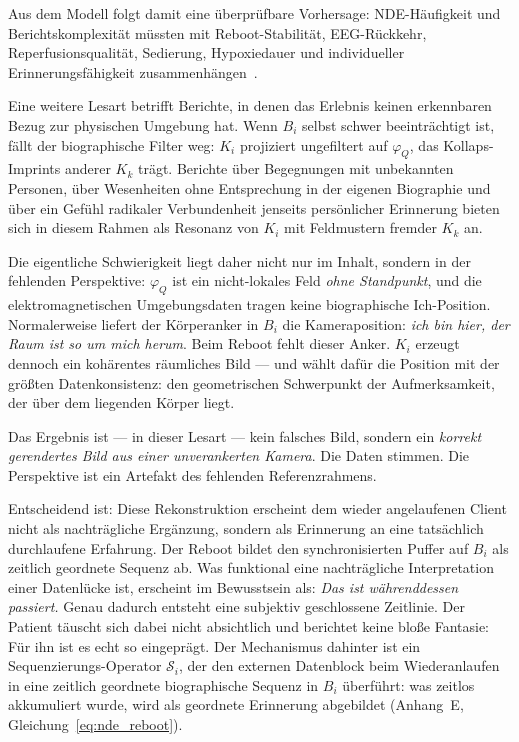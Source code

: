 \documentclass[11pt,a4paper]{article}
\begin{document}
Aus dem Modell folgt damit eine überprüfbare Vorhersage: NDE-Häufigkeit und
Berichtskomplexität müssten mit Reboot-Stabilität, EEG-Rückkehr,
Reperfusionsqualität, Sedierung, Hypoxiedauer und individueller
Erinnerungsfähigkeit zusammenhängen~\citep{parnia2023}.

Eine weitere Lesart betrifft Berichte, in denen
das Erlebnis keinen erkennbaren Bezug zur physischen Umgebung hat.
Wenn $B_i$ selbst schwer beeinträchtigt ist, fällt der biographische Filter
weg: $K_i$ projiziert ungefiltert auf $\varphi_Q$, das Kollaps-Imprints
anderer $K_k$ trägt. Berichte über Begegnungen mit unbekannten Personen,
über Wesenheiten ohne Entsprechung in der eigenen Biographie und über ein
Gefühl radikaler Verbundenheit jenseits persönlicher Erinnerung bieten sich
in diesem Rahmen als Resonanz von $K_i$ mit Feldmustern fremder $K_k$ an.

Die eigentliche Schwierigkeit liegt daher nicht nur im Inhalt, sondern in der
fehlenden Perspektive: $\varphi_Q$ ist ein nicht-lokales Feld \emph{ohne
Standpunkt}, und die elektromagnetischen Umgebungsdaten tragen keine
biographische Ich-Position. Normalerweise liefert der Körperanker in $B_i$
die Kameraposition: \emph{ich bin hier, der Raum ist so um mich herum}. Beim
Reboot fehlt dieser Anker. $K_i$ erzeugt dennoch ein kohärentes räumliches
Bild — und wählt dafür die Position mit der größten Datenkonsistenz: den
geometrischen Schwerpunkt der Aufmerksamkeit, der über dem liegenden Körper liegt.

Das Ergebnis ist — in dieser Lesart — kein falsches Bild, sondern ein
\emph{korrekt gerendertes Bild aus einer unverankerten Kamera}.
Die Daten stimmen. Die Perspektive ist ein Artefakt des fehlenden Referenzrahmens.

Entscheidend ist: Diese Rekonstruktion erscheint dem wieder angelaufenen
Client nicht als nachträgliche Ergänzung, sondern als Erinnerung an eine
tatsächlich durchlaufene Erfahrung. Der Reboot bildet den synchronisierten
Puffer auf $B_i$ als zeitlich geordnete Sequenz ab. Was funktional eine
nachträgliche Interpretation einer Datenlücke ist, erscheint im Bewusstsein
als: \emph{Das ist währenddessen passiert.} Genau dadurch entsteht eine
subjektiv geschlossene Zeitlinie. Der Patient täuscht sich dabei nicht
absichtlich und berichtet keine bloße Fantasie: Für ihn ist es echt so
eingeprägt. Der Mechanismus dahinter ist ein Sequenzierungs-Operator $\mathcal{S}_i$, der den
externen Datenblock beim Wiederanlaufen in eine zeitlich geordnete biographische
Sequenz in $B_i$ überführt: was zeitlos akkumuliert wurde, wird als geordnete
Erinnerung abgebildet (Anhang~E, Gleichung~\eqref{eq:nde_reboot}).
\end{document}
